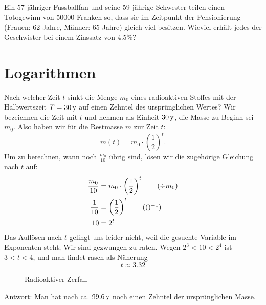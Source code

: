 \documentclass[%
11pt,%
twoside,%
titlepage,%
german,%
headsepline%
]{scrartcl}
\begin{document}
\begin{ueb}[Toto]
Ein 57 jähriger Fussballfan und seine 59 jährige Schwester teilen einen Totogewinn von 50000 Franken so, dass sie im Zeitpunkt der Pensionierung (Frauen: 62 Jahre, Männer: 65 Jahre) gleich viel besitzen. Wieviel erhält jedes der Geschwister bei einem Zinssatz von 4.5\%?
\end{ueb}

\clearpage

\section{Logarithmen}
\begin{bsp}
Nach welcher Zeit $t$ sinkt die Menge $m_0$ eines radioaktiven Stoffes mit der Halbwertszeit $T=\unit[30]{y}$ auf einen Zehntel des ursprünglichen Wertes? Wir bezeichnen die Zeit mit $t$ und nehmen als Einheit $\unit[30]{y}$, die Masse zu Beginn sei $m_0$. Also haben wir für die Restmasse $m$ zur Zeit $t$:
$$m(t)=m_0\cdot\left(\frac{1}{2}\right)^t.$$
Um zu berechnen, wann noch $\frac{m_0}{10}$ übrig sind, lösen wir die zugehörige Gleichung nach $t$ auf:
    \begin{align*}
    \frac{m_0}{10}&=m_0\cdot\left(\frac{1}{2}\right)^t\tag{$\div m_0$}\\
    \frac{1}{10}&=\left(\frac{1}{2}\right)^t\tag{$()^{-1}$}\\
    10&=2^t
    \end{align*}
    Das Auflösen nach $t$ gelingt uns leider nicht, weil die gesuchte Variable
    im Exponenten steht; Wir sind gezwungen zu raten. Wegen
    $2^3<10<2^4$ ist $3<t<4$, und man findet rasch als Näherung
    $$t\approx3.32$$    
\begin{figure}
\begin{center}
\end{center}
\caption{Radioaktiver Zerfall}\label{zerfall}
\end{figure}
   Antwort: Man hat nach ca. $\unit[99.6]{y}$
    noch einen Zehntel der ursprünglichen Masse.
    \end{bsp}
\end{document}
